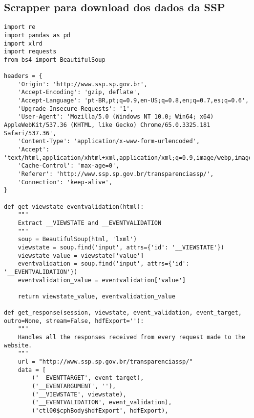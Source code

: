 \documentclass[
	12pt,
	openright,			%
	twoside,			%
	a4paper,			%
	chapter=TITLE,		%
	section=TITLE,		%
	subsection=TITLE,	%
	subsubsection=TITLE,%
	english,			%
	french,				%
	spanish,			%
	brazil				%
	]{abntex2}
\begin{document}
\printbibliography[title={Referências}]


\begin{anexosenv}
\partanexos
\chapter{Scrapper para download dos dados da SSP}

\begin{lstlisting}[frame=single]
import re
import pandas as pd
import xlrd
import requests
from bs4 import BeautifulSoup

headers = {
    'Origin': 'http://www.ssp.sp.gov.br',
    'Accept-Encoding': 'gzip, deflate',
    'Accept-Language': 'pt-BR,pt;q=0.9,en-US;q=0.8,en;q=0.7,es;q=0.6',
    'Upgrade-Insecure-Requests': '1',
    'User-Agent': 'Mozilla/5.0 (Windows NT 10.0; Win64; x64) AppleWebKit/537.36 (KHTML, like Gecko) Chrome/65.0.3325.181 Safari/537.36',
    'Content-Type': 'application/x-www-form-urlencoded',
    'Accept': 'text/html,application/xhtml+xml,application/xml;q=0.9,image/webp,image/apng,*/*;q=0.8',
    'Cache-Control': 'max-age=0',
    'Referer': 'http://www.ssp.sp.gov.br/transparenciassp/',
    'Connection': 'keep-alive',
}

def get_viewstate_eventvalidation(html):
    """
    Extract __VIEWSTATE and __EVENTVALIDATION
    """
    soup = BeautifulSoup(html, 'lxml')
    viewstate = soup.find('input', attrs={'id': '__VIEWSTATE'})
    viewstate_value = viewstate['value']
    eventvalidation = soup.find('input', attrs={'id': '__EVENTVALIDATION'})
    eventvalidation_value = eventvalidation['value']

    return viewstate_value, eventvalidation_value

def get_response(session, viewstate, event_validation, event_target, outro=None, stream=False, hdfExport=''):
    """
    Handles all the responses received from every request made to the website.
    """
    url = "http://www.ssp.sp.gov.br/transparenciassp/"
    data = [
        ('__EVENTTARGET', event_target),
        ('__EVENTARGUMENT', ''),
        ('__VIEWSTATE', viewstate),
        ('__EVENTVALIDATION', event_validation),
        ('ctl00$cphBody$hdfExport', hdfExport),


\end{lstlisting}
\end{anexosenv}
\end{document}
